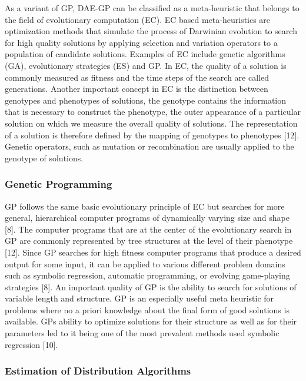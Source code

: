 \documentclass[
  11pt,
]{article}
\begin{document}
As a variant of GP, DAE-GP can be classified as a meta-heuristic that
belongs to the field of evolutionary computation (EC). EC based
meta-heuristics are optimization methods that simulate the process of
Darwinian evolution to search for high quality solutions by applying
selection and variation operators to a population of candidate
solutions. Examples of EC include genetic algorithms (GA), evolutionary
strategies (ES) and GP. In EC, the quality of a solution is commonly
measured as fitness and the time steps of the search are called
generations. Another important concept in EC is the distinction between
genotypes and phenotypes of solutions, the genotype contains the
information that is necessary to construct the phenotype, the outer
appearance of a particular solution on which we measure the overall
quality of solutions. The representation of a solution is therefore
defined by the mapping of genotypes to phenotypes {[}12{]}. Genetic
operators, such as mutation or recombination are usually applied to the
genotype of solutions.

\hypertarget{genetic-programming}{%
\subsubsection{Genetic Programming}\label{genetic-programming}}

GP follows the same basic evolutionary principle of EC but searches for
more general, hierarchical computer programs of dynamically varying size
and shape {[}8{]}. The computer programs that are at the center of the
evolutionary search in GP are commonly represented by tree structures at
the level of their phenotype {[}12{]}. Since GP searches for high
fitness computer programs that produce a desired output for some input,
it can be applied to various different problem domains such as symbolic
regression, automatic programming, or evolving game-playing strategies
{[}8{]}. An important quality of GP is the ability to search for
solutions of variable length and structure. GP is an especially useful
meta heuristic for problems where no a priori knowledge about the final
form of good solutions is available. GPs ability to optimize solutions
for their structure as well as for their parameters led to it being one
of the most prevalent methods used symbolic regression {[}10{]}.

\hypertarget{estimation-of-distribution-algorithms}{%
\subsubsection{Estimation of Distribution
Algorithms}\label{estimation-of-distribution-algorithms}}
\end{document}
